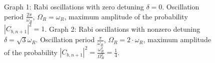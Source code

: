 \begin{figure}
\centering



\caption{Graph 1: Rabi oscillations with zero detuning $\delta = 0$. Oscillation period
  $\frac{2 \pi}{\omega_R}$, $\Omega_R = \omega_R$,
  maximum amplitude of the probability $\left|C_{b,n+1}\right|^2 = 1$.
  Graph 2: Rabi oscillations with nonzero detuning $\delta =
  \sqrt{3}\omega_R$. 
  Oscillation period $\frac{\pi}{\omega_R}$, $\Omega_R = 2 \cdot \omega_R$,
  maximum amplitude
  of the probability $\left|C_{b,n+1}\right|^2 =
  \frac{\omega_R^2}{\Omega_R^2} = \frac{1}{4}$.} 
\label{figPart1InteractionRabiDelta}
\end{figure}